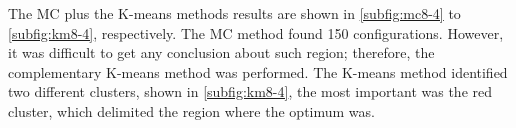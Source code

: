 The MC plus the K-means methods results are shown in \ref{subfig:mc8-4}
to \ref{subfig:km8-4}, respectively. The MC method found 150 configurations.
However, it was difficult to get any conclusion about such region;
therefore, the complementary K-means method was performed. The K-means
method identified two different clusters, shown in \ref{subfig:km8-4},
the most important was the red cluster, which delimited the region
where the optimum was.


